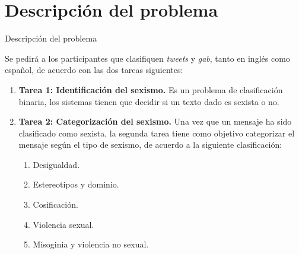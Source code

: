 \documentclass[10pt]{beamer}
\begin{document}
\section{Descripción del problema}
\begin{frame}{Descripción del problema}
\justify
\small

Se pedirá a los participantes que clasifiquen \emph{tweets} y \emph{gab}, tanto en inglés como español, de acuerdo con las dos tareas siguientes:

\begin{enumerate}
\item \textbf{Tarea 1: Identificación del sexismo.} Es un problema de clasificación binaria, los sistemas tienen que decidir si un texto dado es sexista o no.

\item \textbf{Tarea 2: Categorización del sexismo.} Una vez que un mensaje ha sido clasificado como sexista, la segunda tarea tiene como objetivo categorizar el mensaje según el tipo de sexismo, de acuerdo a la siguiente clasificación:

\begin{enumerate}
\item Desigualdad.
\item Estereotipos y dominio.
\item Cosificación.
\item Violencia sexual.
\item Misoginia y violencia no sexual.
\end{enumerate}

\end{enumerate}

\end{frame}
\end{document}
